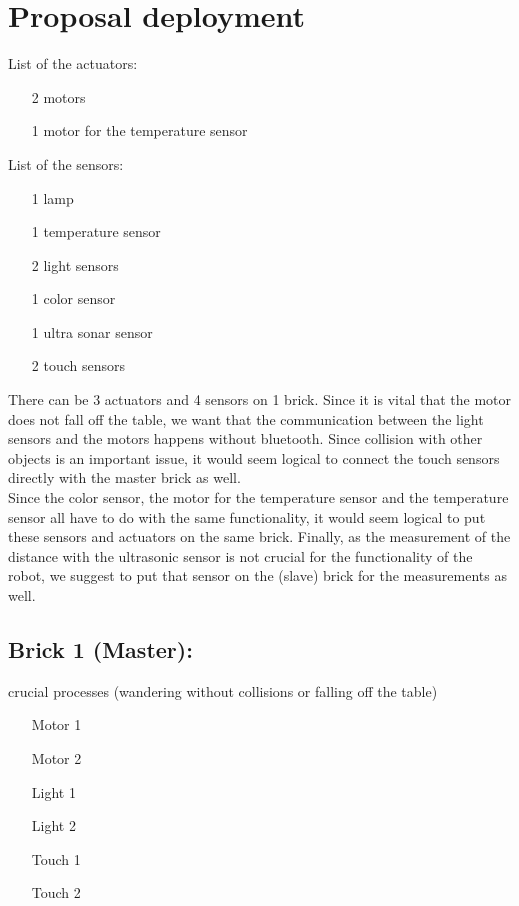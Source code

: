 \documentclass[10pt,a4paper]{article}
\begin{document}
\section*{Proposal deployment}
List of the actuators:
\begin{itemize}
\item[2] motors
\item[1] motor for  the temperature sensor
\end{itemize}

\noindent List of the sensors:
\begin{itemize}
\item[1] lamp
\item[1] temperature sensor
\item[2] light sensors
\item[1] color sensor
\item[1] ultra sonar sensor
\item[2] touch sensors
\end{itemize}

There can be 3 actuators and 4 sensors on 1 brick.
Since it is vital that the motor does not fall off the table, we want that the communication between the light sensors and the motors happens without bluetooth. Since collision with other objects is an important issue, it would seem logical to connect the touch sensors directly with the master brick as well.\\ 

Since the color sensor, the motor for the temperature sensor and the temperature sensor all have to do with the same functionality, it would seem logical to put these sensors and actuators on the same brick. Finally, as the measurement of the distance with the ultrasonic sensor is not crucial for the functionality of the robot, we suggest to put that sensor on the (slave) brick for the measurements as well.\\

\subsection*{Brick 1 (Master):} crucial processes (wandering without collisions or falling off the table)
\begin{itemize}
\item[] Motor 1
\item[] Motor 2
\item[] Light 1
\item[] Light 2
\item[] Touch 1
\item[] Touch 2
\end{itemize}
\end{document}
